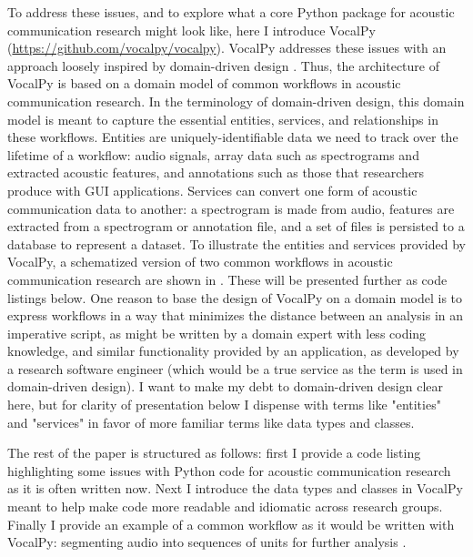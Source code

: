 \documentclass[11pt]{article}
\begin{document}
To address these issues, and to explore what a core Python package for acoustic communication research might look like, here I introduce VocalPy (\url{https://github.com/vocalpy/vocalpy}).
VocalPy addresses these issues with an approach loosely inspired by domain-driven design \cite{evansDomaindrivenDesignTackling2004}.
Thus, the architecture of VocalPy is based on a domain model of common workflows in acoustic communication research. In the terminology of domain-driven design, this domain model is meant to capture the essential entities, services, and relationships in these workflows. 
Entities are uniquely-identifiable data we need to track over the lifetime of a workflow: audio signals, array data such as spectrograms and extracted acoustic features, and annotations such as those that researchers produce with GUI applications.
Services can convert one form of acoustic communication data to another: a spectrogram is made from audio, features are extracted from a spectrogram or annotation file, and a set of files is persisted to a database to represent a dataset.
To illustrate the entities and services provided by VocalPy, a schematized version of two common workflows in acoustic communication research are shown in . These will be presented further as code listings below.
One reason to base the design of VocalPy on a domain model is to express workflows in a way that minimizes the distance between an analysis in an imperative script, as might be written by a domain expert with less coding knowledge, and similar functionality provided by an application, as developed by a research software engineer (which would be a true service as the term is used in domain-driven design).
I want to make my debt to domain-driven design clear here, but for clarity of presentation below I dispense with terms like "entities" and "services" in favor of more familiar terms like data types and classes.

The rest of the paper is structured as follows: 
first I provide a code listing highlighting some issues with Python code for acoustic communication research as it is often written now.
Next I introduce the data types and classes in VocalPy meant to help make code more readable and idiomatic across research groups.
Finally I provide an example of a common workflow as it would be written with VocalPy: segmenting audio into sequences of units for further analysis \cite{kershenbaumAcousticSequencesNonhuman2016}.
\end{document}
